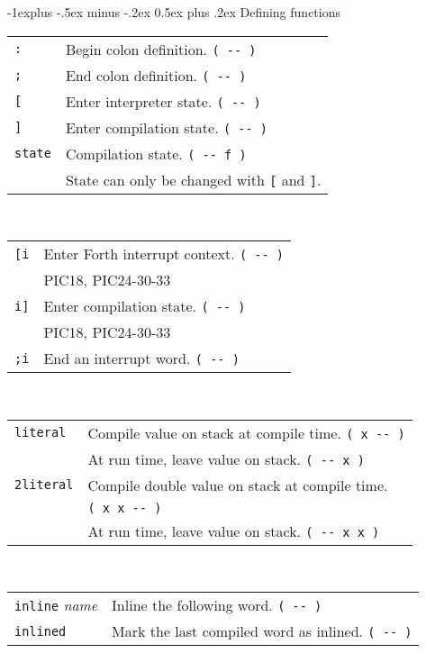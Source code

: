 \documentclass[10pt,landscape,a4paper]{article}
\makeatletter
\renewcommand{\subsection}{\@startsection{subsection}{2}{0mm}%
                                {-1explus -.5ex minus -.2ex}%
                                {0.5ex plus .2ex}%
                                {\normalfont\normalsize\bfseries}}
\newcommand{\compileonly}{\color{blue}}
\makeatother
\begin{document}
\begin{multicols}{3}
\subsection{Defining functions}
\begin{tabular}{@{}ll@{}}
\verb!:!  & Begin colon definition. \verb!( -- )! \\
{\compileonly\verb!;!}  & End colon definition.  \verb!( -- )! \\
\verb![!  & Enter interpreter state. \verb!( -- )! \\
\verb!]!  & Enter compilation state. \verb!( -- )! \\
\verb!state! & Compilation state. \verb!( -- f )! \\
             & State can only be changed with \verb![! and \verb!]!. \\
\end{tabular} \\
\begin{tabular}{@{}ll@{}}
{\compileonly\verb![i!}  & Enter Forth interrupt context. \verb!( -- )! \\
                         & PIC18, PIC24-30-33 \\
{\compileonly\verb!i]!}  & Enter compilation state. \verb!( -- )! \\
                         & PIC18, PIC24-30-33 \\
{\compileonly\verb!;i!}  & End an interrupt word. \verb!( -- )! \\
\end{tabular} \\
\begin{tabular}{@{}ll@{}}
\verb!literal! & Compile value on stack at compile time. \verb!( x -- )! \\
               & At run time, leave value on stack. \verb!( -- x )! \\
\verb!2literal! & Compile double value on stack at compile time. \\
                &\verb!( x x -- )! \\
                & At run time, leave value on stack. \verb!( -- x x )! \\
\end{tabular} \\
\begin{tabular}{@{}ll@{}}
\verb!inline! \textit{name} & Inline the following word. \verb!( -- )! \\
\verb!inlined!  & Mark the last compiled word as inlined. \verb!( -- )! \\

\end{tabular}
\end{multicols}
\end{document}
